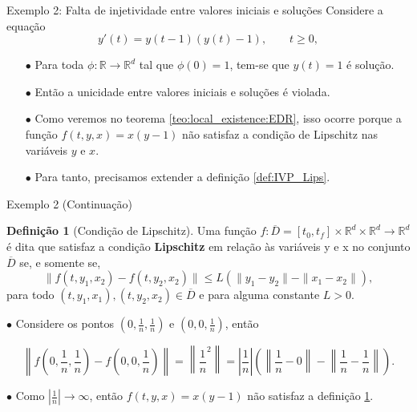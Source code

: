\documentclass{beamer}
\newcommand{\R}{\mathbb{R}}
\theoremstyle{plain}
\theoremstyle{definition}
\newtheorem{defi}{Definição}
\begin{document}

\begin{frame}{Exemplo 2: Falta de injetividade entre valores iniciais e soluções}
        Considere a equação
        \begin{equation}
            y'(t) = y(t - 1) (y(t) - 1), \qquad t \geq 0,
            \label{chap1:ex2:eq:1}
        \end{equation}
        \begin{itemize}
            \item[$\bullet$] Para toda $\phi:\R \to \R^d$ tal que $\phi(0) = 1$, tem-se que $y(t) = 1$ é solução.
            \item[$\bullet$] Então a unicidade entre valores iniciais e soluções é violada. 
            \item[$\bullet$] Como veremos no teorema \ref{teo:local_existence:EDR}, isso ocorre porque a função $f(t, y, x) = x(y - 1)$ não satisfaz a condição de Lipschitz nas variáveis $y$ e $x$. 
            \item[$\bullet$] Para tanto, precisamos extender a definição \ref{def:IVP_Lips}.
        \end{itemize} 
\end{frame}


\begin{frame}{Exemplo 2 (Continuação)}

        \begin{defi}[Condição de Lipschitz]
            \label{def:EDR:Lips}
            Uma função $f: \overline{D} = [t_0, t_f] \times \R^d \times \R^d \to \R^d $ é dita que satisfaz a condição \textbf{Lipschitz} em relação às variáveis y e x no conjunto $\overline{D}$ se, e somente se,
            \begin{equation}
                \| f(t, y_1, x_2) - f(t, y_2, x_2) \| \leq L (\| y_1 - y_2 \| - \|x_1 - x_2\|), 
                \label{chap1:def:eq:EDR_Lips}
            \end{equation}
            para todo $(t, y_1, x_1), (t, y_2, x_2) \in \overline{D}$ e para alguma constante $L>0$.
        \end{defi}


        $\bullet$ Considere os pontos $(0, \frac{1}{n}, \frac{1}{n})$ e $(0, 0, \frac{1}{n})$, então

        \noindent
        \footnotesize
        \[
            \left\| f\left(0, \frac{1}{n}, \frac{1}{n}\right) - f\left(0, 0, \frac{1}{n}\right) \right\| =  \left\|\frac{1}{n}^2 \right\| =  \left|\frac{1}{n}\right|\left( \left\|\frac{1}{n} - 0\right\| - \left\|\frac{1}{n} - \frac{1}{n} \right\| \right).
        \]

        \normalsize
        $\bullet$ Como $|\frac{1}{n}| \to \infty$, então $f(t, y, x) = x(y-1)$ não satisfaz a definição \ref{def:EDR:Lips}.
\end{frame}
\end{document}
